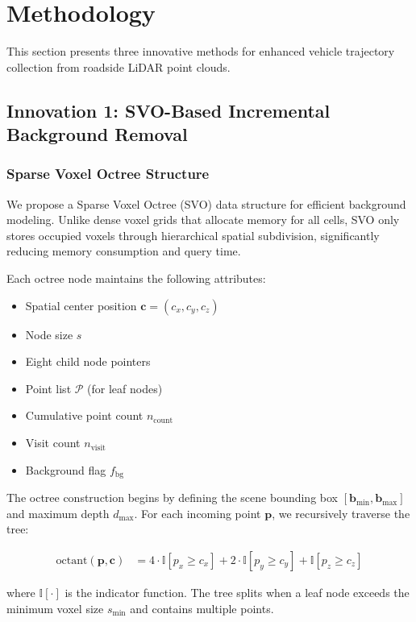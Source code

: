 \documentclass[numbered]{trbunofficial}
\begin{document}
\section{Methodology}

This section presents three innovative methods for enhanced vehicle trajectory collection from roadside LiDAR point clouds.

\subsection{Innovation 1: SVO-Based Incremental Background Removal}

\subsubsection{Sparse Voxel Octree Structure}

We propose a Sparse Voxel Octree (SVO) data structure for efficient background modeling. Unlike dense voxel grids that allocate memory for all cells, SVO only stores occupied voxels through hierarchical spatial subdivision, significantly reducing memory consumption and query time.

Each octree node maintains the following attributes:
\begin{itemize}
  \item Spatial center position $\mathbf{c} = (c_x, c_y, c_z)$
  \item Node size $s$
  \item Eight child node pointers
  \item Point list $\mathcal{P}$ (for leaf nodes)
  \item Cumulative point count $n_{\text{count}}$
  \item Visit count $n_{\text{visit}}$
  \item Background flag $f_{\text{bg}}$
\end{itemize}

The octree construction begins by defining the scene bounding box $[\mathbf{b}_{\min}, \mathbf{b}_{\max}]$ and maximum depth $d_{\max}$. For each incoming point $\mathbf{p}$, we recursively traverse the tree:

\begin{align}
  \text{octant}(\mathbf{p}, \mathbf{c}) &= 4 \cdot \mathbb{I}[p_x \geq c_x] + 2 \cdot \mathbb{I}[p_y \geq c_y] + \mathbb{I}[p_z \geq c_z]
\end{align}

where $\mathbb{I}[\cdot]$ is the indicator function. The tree splits when a leaf node exceeds the minimum voxel size $s_{\min}$ and contains multiple points.
\end{document}

